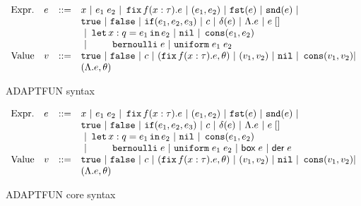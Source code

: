 \begin{figure}
    \centering
    \[\begin{array}{llll}
\mbox{Expr.} & \expr & ::= & x ~|~ \expr_1 \eapp \expr_2 ~|~ \efix f(x:\type).\expr
 ~|~ (\expr_1, \expr_2) ~|~ \eprojl(\expr) ~|~ \eprojr(\expr) ~| \\
%
& & & \etrue ~|~ \efalse ~|~ \eif(\expr_1, \expr_2, \expr_3) ~|~
\econst ~|~ \eop(\expr)  ~|~  \eilam \expr ~|~ \expr \eapp []  \\
& & & ~|~  \elet  x:q = \expr_1 \ein \expr_2  ~|~ \enil ~|~  \econs (
      \expr_1, \expr_2) \\
& & & ~|~  ~~~~~~~
 \bernoulli \eapp \expr ~|~ \uniform \eapp \expr_1 \eapp
      \expr_2  \\
%
\mbox{Value} & \valr & ::= & \etrue ~|~ \efalse ~|~ \econst ~|~
(\efix f(x:\type).\expr, \env) ~|~ (\valr_1, \valr_2) 
    ~|~ \enil ~|~ \econs (\valr_1, \valr_2) | \\
& & & (\eilam \expr , \env)  
\end{array}\]
    \caption{ADAPTFUN syntax}
    \label{fig:syntax}
\end{figure}
\begin{figure}
    \centering
    \[\begin{array}{llll}
\mbox{Expr.} & \expr & ::= & x ~|~ \expr_1 \eapp \expr_2 ~|~ \efix f(x:\type).\expr
 ~|~ (\expr_1, \expr_2) ~|~ \eprojl(\expr) ~|~ \eprojr(\expr) ~| \\
%
& & & \etrue ~|~ \efalse ~|~ \eif(\expr_1, \expr_2, \expr_3) ~|~
\econst ~|~ \eop(\expr)  ~|~  \eilam \expr ~|~ \expr \eapp []  \\
& & & ~|~  \elet  x:q = \expr_1 \ein \expr_2  ~|~ \enil ~|~  \econs (
      \expr_1, \expr_2) \\
& & & ~|~  ~~~~~~~
 \bernoulli \eapp \expr ~|~ \uniform \eapp \expr_1 \eapp
      \expr_2 ~|~ \cbox \eapp \expr ~|~ \cder \eapp \expr \\
%
\mbox{Value} & \valr & ::= & \etrue ~|~ \efalse ~|~ \econst ~|~
(\efix f(x:\type).\expr, \env) ~|~ (\valr_1, \valr_2) 
    ~|~ \enil ~|~ \econs (\valr_1, \valr_2) | \\
& & & (\eilam \expr , \env)  
\end{array}\]
    \caption{ADAPTFUN core syntax}
    \label{fig:algo-syntax}
\end{figure}

